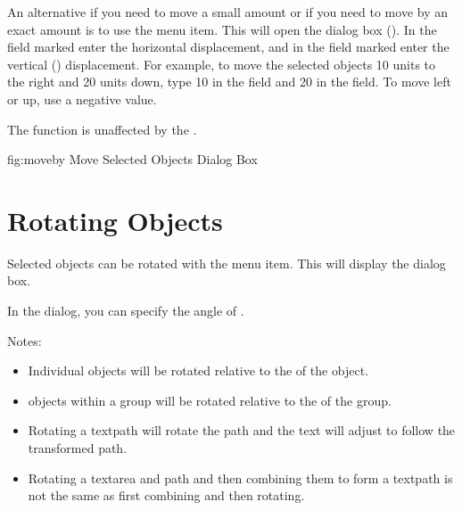 
An alternative if you need to move a small amount or if you need to
move by an exact amount is to use the  menu item.
This will open the  dialog box ().
In the field marked  enter the horizontal
displacement, and in the field marked 
enter the vertical () displacement. For example, to move the
selected \glspl*{object} 10 units to the right and 20 units down,
type 10 in the  field and 20 in the
 field. To move left or up, use a negative
value.

\begin{information}
The  function is unaffected by the \gridlock.
\end{information}

\FloatFig
  {fig:moveby}
  {}
  {Move Selected Objects Dialog Box}


\section{Rotating Objects}\label{sec:rotateobjects}


Selected \glspl{object} can be rotated with the
 menu item. This will display the
 dialog box.


In the  dialog,
you can specify the angle of
.

Notes:
\begin{itemize}
\item Individual \glspl{object}
will be rotated relative to the  of the \gls{object}.

\item \Glspl*{object} within a
\gls{group} will be rotated relative to the  of the
group.

\item Rotating a \gls{textpath} will rotate the path and the text
will adjust to follow the transformed path.

\item Rotating a \gls*{textarea} and \gls*{path} and then combining
them to form a \gls*{textpath} is not the same as first combining
and then rotating.

\end{itemize}

